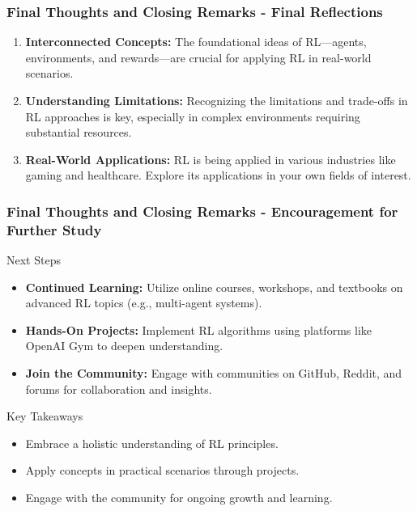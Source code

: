 \documentclass[aspectratio=169]{beamer}
\begin{document}
\begin{frame}[fragile]
    \frametitle{Final Thoughts and Closing Remarks - Final Reflections}
    \begin{enumerate}
        \item \textbf{Interconnected Concepts:} The foundational ideas of RL—agents, environments, and rewards—are crucial for applying RL in real-world scenarios.
        \item \textbf{Understanding Limitations:} Recognizing the limitations and trade-offs in RL approaches is key, especially in complex environments requiring substantial resources.
        \item \textbf{Real-World Applications:} RL is being applied in various industries like gaming and healthcare. Explore its applications in your own fields of interest.
    \end{enumerate}
\end{frame}

\begin{frame}[fragile]
    \frametitle{Final Thoughts and Closing Remarks - Encouragement for Further Study}
    \begin{block}{Next Steps}
        \begin{itemize}
            \item \textbf{Continued Learning:} Utilize online courses, workshops, and textbooks on advanced RL topics (e.g., multi-agent systems).
            \item \textbf{Hands-On Projects:} Implement RL algorithms using platforms like OpenAI Gym to deepen understanding.
            \item \textbf{Join the Community:} Engage with communities on GitHub, Reddit, and forums for collaboration and insights.
        \end{itemize}
    \end{block}
    \begin{block}{Key Takeaways}
        \begin{itemize}
            \item Embrace a holistic understanding of RL principles.
            \item Apply concepts in practical scenarios through projects.
            \item Engage with the community for ongoing growth and learning.
        \end{itemize}
    \end{block}
\end{frame}
\end{document}
